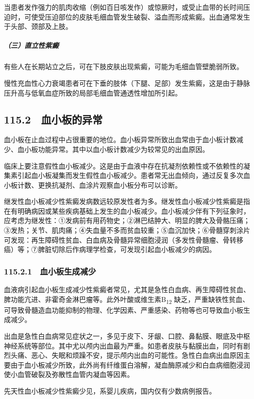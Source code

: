当患者发作强力的肌肉收缩（例如百日咳发作）或惊厥时，或受止血带的长时间压迫时，可使受压迫部位的皮肤毛细血管发生破裂、溢血而形成紫癜。出血通常发生于头部、颈部及上肢。

\subparagraph{（三）直立性紫癜}

有些人在长期站立之后，可在下肢皮肤出现紫癜，可能为毛细血管壁脆弱所致。

慢性充血性心力衰竭患者可在下垂的肢体（下腿、足部）发生紫癜，这是由于静脉压升高与低氧血症所致的局部毛细血管通透性增加所引起。

\subsection{115.2　血小板的异常}

血小板在止血过程中占很重要的地位。血小板异常所致出血常由于血小板计数减少、血小板功能异常。其中以血小板计数减少为较常见的出血原因。

临床上要注意假性血小板减少。这是由于血液中存在抗凝剂依赖性或不依赖性的凝集素引起血小板凝集而发生假性血小板减少。患者常无出血倾向，通过反复多次血小板计数、更换抗凝剂、血涂片观察血小板分布可以诊断。

继发性血小板减少性紫癜发病数远较原发性者为多。继发性血小板减少性紫癜是指在有明确病因或某些疾病基础上发生的血小板减少。血小板减少伴有下列征象时，应考虑为继发性：①发病前有用药物史；②淋巴结肿大、明显的脾大及骨骼压痛；③发热；关节、肌肉痛；④失血量不多而贫血较重；⑤血沉加快；⑥骨髓穿刺涂片可发现：再生障碍性贫血、白血病及骨髓异常细胞浸润（多发性骨髓瘤、骨转移癌）等；⑦脾脏切除后作病理学检查，可发现引起血小板减少的病因。

\subsubsection{115.2.1　血小板生成减少}

血液病引起血小板生成减少性紫癜者常见，尤其是急性白血病、再生障碍性贫血、脾功能亢进、非霍奇金淋巴瘤等。此外叶酸或维生素B\textsubscript{12}
缺乏，严重缺铁性贫血、可导致骨髓造血功能抑制的物理、化学因素、严重感染、药物等也可导致血小板生成减少。

出血是急性白血病常见症状之一，多见于皮下、牙龈、口腔、鼻黏膜、眼底及中枢神经系统等部位。其中尤以颅内出血最为严重。如患者皮肤与黏膜出血，同时有剧烈头痛、恶心、失眠和烦躁不安，提示颅内出血的可能性。急性白血病出血原因主要由于血小板减少所致，此外尚有纤维蛋白溶解，凝血酶原减少和白血病细胞浸润使小血管破裂及弥散性血管内凝血等因素。

先天性血小板减少性紫癜少见，系婴儿疾病，国内仅有少数病例报告。

